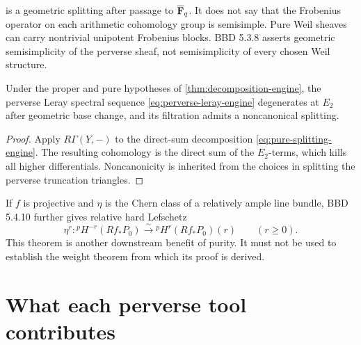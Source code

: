 \begin{warning}
 is a geometric splitting after passage to
\(\overline{\mathbf F}_q\).  It does not say that the Frobenius operator on each arithmetic
cohomology group is semisimple.  Pure Weil sheaves can carry nontrivial
unipotent Frobenius blocks.  BBD 5.3.8 asserts geometric semisimplicity of
the perverse sheaf, not semisimplicity of every chosen Weil structure.
\end{warning}

\begin{corollary}
\label{cor:perverse-leray-degeneration-engine}
Under the proper and pure hypotheses of
\cref{thm:decomposition-engine}, the perverse Leray spectral sequence
\eqref{eq:perverse-leray-engine} degenerates at \(E_2\) after geometric base
change, and its filtration admits a noncanonical splitting.
\end{corollary}

\begin{proof}
Apply \(R\Gamma(Y,-)\) to the direct-sum decomposition
\eqref{eq:pure-splitting-engine}.  The resulting cohomology is the direct sum
of the \(E_2\)-terms, which kills all higher differentials.  Noncanonicity is
inherited from the choices in splitting the perverse truncation triangles.
\end{proof}

If \(f\) is projective and \(\eta\) is the Chern class of a relatively ample
line bundle, BBD 5.4.10 further gives relative hard Lefschetz
\[
  \eta^r:{}^pH^{-r}(Rf_*P_0)
  \xrightarrow{\sim}{}^pH^r(Rf_*P_0)(r)
  \qquad(r\geq0).
\tag{\thechapter.16}\label{eq:relative-hard-lefschetz-engine}
\]
This theorem is another downstream benefit of purity.  It must not be used
to establish the weight theorem from which its proof is derived.

\section{What each perverse tool contributes}

